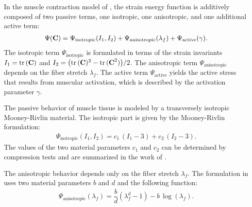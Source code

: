 
In the muscle contraction model of \cite{Heidlauf2013}, the strain energy function is additively composed of two passive terms, one isotropic, one anisotropic, and one additional active term:
\begin{align*}
  \Psi(\textbf{C}) = \Psi_\text{isotropic}(I_1,I_2) + \Psi_\text{anisotropic}(\lambda_f) + \Psi_\text{active}(\gamma).
\end{align*}
The isotropic term $\Psi_\text{isotropic}$ is formulated in terms of the strain invariants $I_1=\hbox{tr} \,(\textbf{C})$ and $I_2=\big(\hbox{tr} \,(\textbf{C})^2 - \hbox{tr} \,(\textbf{C}^2)\big)/2$. The anisotropic term $\Psi_\text{anisotropic}$ depends on the fiber stretch $\lambda_f$. The active term $\Psi_\text{active}$ yields the active stress that results from muscular activation, which is described by the activation parameter $\gamma$.

The passive behavior of muscle tissue is modeled by a transversely isotropic Mooney-Rivlin material.
The isotropic part is given by the Mooney-Rivlin formulation:%
\begin{align}\label{eq:mooney_rivlin}
  \Psi_\text{isotropic}(I_1,I_2) = c_1\,(I_1 - 3) + c_2\,(I_2-3).
\end{align}
The values of the two material parameters $c_1$ and $c_2$ can be determined by compression tests and are summarized in the work of \cite{Heidlauf2013}.

The anisotropic behavior depends only on the fiber stretch $\lambda_f$. The formulation in \cite{Heidlauf2013} uses two material parameters $b$ and $d$ and the following function:
\begin{align*}
  \Psi_\text{anisotropic}(\lambda_f) = \dfrac{b}{d}(\lambda_f^d - 1) - b\,\log(\lambda_f).
\end{align*}
%

